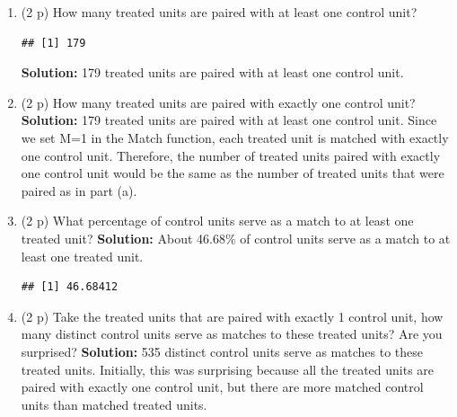 \documentclass[
]{article}
\newenvironment{Shaded}{\begin{snugshade}}{\end{snugshade}}
\newcommand{\DecValTok}[1]{\textcolor[rgb]{0.00,0.00,0.81}{#1}}
\newcommand{\FunctionTok}[1]{\textcolor[rgb]{0.13,0.29,0.53}{\textbf{#1}}}
\newcommand{\NormalTok}[1]{#1}
\newcommand{\OtherTok}[1]{\textcolor[rgb]{0.56,0.35,0.01}{#1}}
\newcommand{\SpecialCharTok}[1]{\textcolor[rgb]{0.81,0.36,0.00}{\textbf{#1}}}
\begin{document}
\begin{enumerate}
\def\labelenumi{\alph{enumi}.}
\item
  (2 p) How many treated units are paired with at least one control
  unit?

\begin{Shaded}
\end{Shaded}

\begin{verbatim}
## [1] 179
\end{verbatim}

  \textbf{Solution:} 179 treated units are paired with at least one
  control unit.
\item
  (2 p) How many treated units are paired with exactly one control unit?
  \newline \textbf{Solution:} 179 treated units are paired with at least
  one control unit. Since we set M=1 in the Match function, each treated
  unit is matched with exactly one control unit. Therefore, the number
  of treated units paired with exactly one control unit would be the
  same as the number of treated units that were paired as in part (a).
\item
  (2 p) What percentage of control units serve as a match to at least
  one treated unit? \newline \textbf{Solution:} About 46.68\% of control
  units serve as a match to at least one treated unit.

\begin{Shaded}
\end{Shaded}

\begin{verbatim}
## [1] 46.68412
\end{verbatim}
\item
  (2 p) Take the treated units that are paired with exactly 1 control
  unit, how many distinct control units serve as matches to these
  treated units? Are you surprised? \newline \textbf{Solution:} 535
  distinct control units serve as matches to these treated units.
  Initially, this was surprising because all the treated units are
  paired with exactly one control unit, but there are more matched
  control units than matched treated units.


\end{enumerate}
\end{document}
